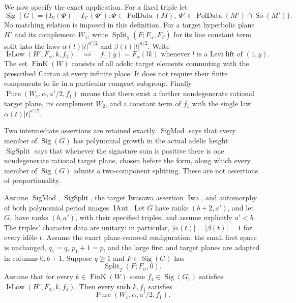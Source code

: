 We now specify the exact application.
For a fixed triple let
\[
 \operatorname{Sig}(G)=
 \{I_V(\Phi)-I_{V'}(\Phi'):
       \Phi\in\operatorname{PolData}(M),\
       \Phi'\in\operatorname{PolData}(M')\cap\operatorname{So}(M')\}.
\]
No matching relation is imposed in this definition.
For a target hyperbolic plane \(H'\) and its complement \(W_1\),
write \(\operatorname{Split}_2(F;F_\alpha,F_\beta)\) for
its line constant term split into the laws
\(\alpha(t)|t|^{a'/2}\) and \(\beta(t)|t|^{a/2}\).
Write
\[
 \operatorname{IsLow}(H',F_\alpha,k,f_1)
 \quad\Longleftrightarrow\quad
 f_1(y)=F_\alpha(lk)
       \text{ whenever }l\text{ is a Levi lift of }(1,y).
\]
The set \(\operatorname{FinK}(W)\) consists of all adelic
target elements commuting with the prescribed Cartan
at every infinite place. It does not require their finite
components to lie in a particular compact subgroup.
Finally \(\operatorname{Pure}(W_1,\alpha,a'/2,f_1)\) means
that there exist a further nondegenerate rational target
plane, its complement \(W_2\), and a constant term of \(f_1\)
with the single law \(\alpha(t)|t|^{a'/2}\).

Two intermediate assertions are retained exactly.
\(\operatorname{SigMod}\) says that every member of
\(\operatorname{Sig}(G)\) has polynomial growth in the actual
adelic height. \(\operatorname{SigSplit}\) says that whenever
the signature sum is positive there is one nondegenerate
rational target plane, chosen before the form, along which
every member of \(\operatorname{Sig}(G)\) admits a two-component
splitting. These are not assertions of proportionality.

\begin{srproposition}
\label{prop:sr-source-two-step}
Assume \(\operatorname{SigMod}\), \(\operatorname{SigSplit}\),
the target Iwasawa assertion \(\operatorname{Iwa}\), and
automorphy of both polynomial period images
\(\operatorname{IAut}\).
Let \(G\) have ranks \((b+2,a')\), and let \(G_1\) have
ranks \((b,a')\), with their specified triples, and assume explicitly
\(a'<b\). The triples' character data are unitary: in particular,
\(|\alpha(t)|=|\beta(t)|=1\) for every idèle \(t\).
Assume the exact plane-removal configuration:
the small first space is unchanged, \(q_1=q\),
\(p_1+1=p\), and the large first and target planes
are adapted in columns \(0,b+1\).
Suppose \(q\ge1\) and \(F\in\operatorname{Sig}(G)\) has
\[
             \operatorname{Split}_2(F;F_\alpha,0).
\]
Assume that for every \(k\in\operatorname{FinK}(W)\) some
\(f_1\in\operatorname{Sig}(G_1)\) satisfies
\(\operatorname{IsLow}(H',F_\alpha,k,f_1)\).
Then every such \(k,f_1\) satisfies
\[
             \operatorname{Pure}(W_1,\alpha,a'/2,f_1).
 \tag{S5}\label{eq:sr-source-two-step-pure}
\]
\end{srproposition}

